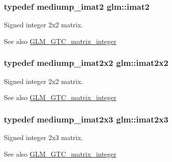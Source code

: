 \subsubsection[{imat2}]{\setlength{\rightskip}{0pt plus 5cm}typedef mediump\+\_\+imat2 {\bf glm\+::imat2}}\label{group__gtc__matrix__integer_ga77a581b3366fb63fc72f8f20830003e0}
Signed integer 2x2 matrix. \begin{DoxySeeAlso}{See also}
\hyperlink{group__gtc__matrix__integer}{G\+L\+M\+\_\+\+G\+T\+C\+\_\+matrix\+\_\+integer} 
\end{DoxySeeAlso}
\hypertarget{group__gtc__matrix__integer_gaf7f44f44d966377666d41ed059524732}{}
\subsubsection[{imat2x2}]{\setlength{\rightskip}{0pt plus 5cm}typedef mediump\+\_\+imat2x2 {\bf glm\+::imat2x2}}\label{group__gtc__matrix__integer_gaf7f44f44d966377666d41ed059524732}
Signed integer 2x2 matrix. \begin{DoxySeeAlso}{See also}
\hyperlink{group__gtc__matrix__integer}{G\+L\+M\+\_\+\+G\+T\+C\+\_\+matrix\+\_\+integer} 
\end{DoxySeeAlso}
\hypertarget{group__gtc__matrix__integer_ga143bc5177bac9991d84b70da03952516}{}
\subsubsection[{imat2x3}]{\setlength{\rightskip}{0pt plus 5cm}typedef mediump\+\_\+imat2x3 {\bf glm\+::imat2x3}}\label{group__gtc__matrix__integer_ga143bc5177bac9991d84b70da03952516}
Signed integer 2x3 matrix. \begin{DoxySeeAlso}{See also}
\hyperlink{group__gtc__matrix__integer}{G\+L\+M\+\_\+\+G\+T\+C\+\_\+matrix\+\_\+integer} 
\end{DoxySeeAlso}
\hypertarget{group__gtc__matrix__integer_gafe2d058e164fd1badace451ffcf4ae46}{}
